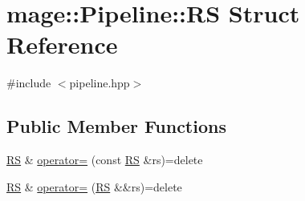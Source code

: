 \hypertarget{structmage_1_1_pipeline_1_1_r_s}{}\section{mage\+:\+:Pipeline\+:\+:RS Struct Reference}
\label{structmage_1_1_pipeline_1_1_r_s}


{\ttfamily \#include $<$pipeline.\+hpp$>$}

\subsection*{Public Member Functions}
\begin{DoxyCompactItemize}
\item 
\hyperlink{structmage_1_1_pipeline_1_1_r_s}{RS} \& \hyperlink{structmage_1_1_pipeline_1_1_r_s_a105519741f76b43d6f6912bb3cec60ef}{operator=} (const \hyperlink{structmage_1_1_pipeline_1_1_r_s}{RS} \&rs)=delete
\item 
\hyperlink{structmage_1_1_pipeline_1_1_r_s}{RS} \& \hyperlink{structmage_1_1_pipeline_1_1_r_s_afac2fc49d1f38059b3f2452179b128df}{operator=} (\hyperlink{structmage_1_1_pipeline_1_1_r_s}{RS} \&\&rs)=delete
\end{DoxyCompactItemize}
